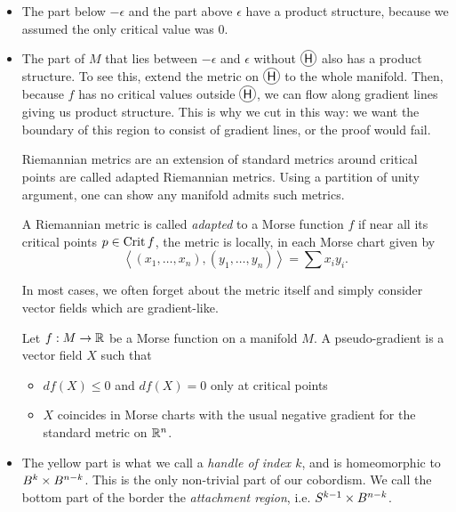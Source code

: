 \begin{itemize}
    \item[\circled{A}] The part below $-\epsilon$ and the part above $\epsilon$ have a product structure, because we assumed the only critical value was $0$.
    \item[\circled{B}] The part of $M$ that lies between $-\epsilon$  and $\epsilon$ without $\circled{H}$ also has a product structure.
        To see this, extend the metric on $\circled{H}$ to the whole manifold. Then, because $f$ has no critical values outside $\circled{H}$, we can flow along gradient lines giving us product structure.
        This is why we cut in this way: we want the boundary of this region to consist of gradient lines, or the proof would fail.

        Riemannian metrics are an extension of standard metrics around critical points are called adapted Riemannian metrics.
        Using a partition of unity argument, one can show any manifold admits such metrics.
        \begin{definition}
            A Riemannian  metric is called \emph{adapted} to a Morse function $f$ if near all its critical points $p \in \operatorname{Crit} f$, the metric is locally, in each Morse chart given by
            \[
            \left<
            (x_1, \ldots, x_n), 
            (y_1, \ldots, y_n)
            \right> = \sum x_i y_i
            .\] 
        \end{definition}
        In most cases, we often forget about the metric itself and simply consider vector fields which are gradient-like.

        \begin{definition}
            Let $f: M \to  \mathbb{R}$ be a Morse function on a manifold $M$. A pseudo-gradient is a vector field $X$ such that
            \begin{itemize}
                \item $df(X) \le 0$ and $df(X) = 0$ only at critical points
                \item $X$ coincides in Morse charts with the usual negative gradient for the standard metric on $\mathbb{R}^{n}$.
            \end{itemize}
        \end{definition}




    \item[\circled{H}]  The yellow part is what we call a \emph{handle of index $k$}, and is homeomorphic to $B^{k} \times B^{n-k}$.
        This is the only non-trivial part of our cobordism.
        We call the bottom part of the border the \emph{attachment region}, i.e. $S^{k-1} \times B^{n-k}$.
\end{itemize}






